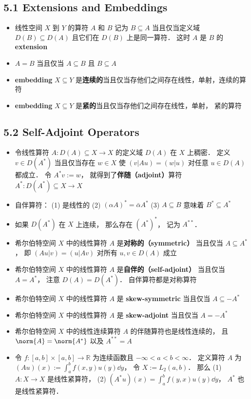 \subsection{5.1 Extensions and Embeddings}
\begin{itemize}
\item 线性空间 $X$ 到 $Y$ 的算符 $A$ 和 $B$ 记为 $B \subseteq A$ 当且仅当定义域 $D(B) \subseteq D(A)$ 且它们在 $D(B)$ 上是同一算符． 这时 $A$ 是 $B$ 的 \textbf{extension}

\item $A = B$ 当且仅当 $A\subseteq B$ 且 $B\subseteq A$

\item \textbf{embedding} $X \subseteq Y$ 是\textbf{连续的}当且仅当存他们之间存在线性，单射，连续的算符

\item \textbf{embedding} $X \subseteq Y$ 是\textbf{紧的}当且仅当存他们之间存在线性，单射， 紧的算符
\end{itemize}


\subsection{5.2 Self-Adjoint Operators}
\begin{itemize}
\item 令线性算符 $A: D(A) \subseteq X \to X$ 的定义域 $D(A)$ 在 $X$ 上稠密． 定义 $v \in D(A^*)$ 当且仅当存在 $w\in X$ 使 $(v|Au) = (w|u)$ 对任意 $u\in D(A)$ 都成立． 令 $A^*v := w$， 就得到了\textbf{伴随（adjoint）}算符 $A^*: D(A^*) \subseteq X \to X$

\item 自伴算符： (1) 是线性的 (2) $(\alpha A)^* = \bar \alpha A^*$ (3) $A \subseteq B$ 意味着 $B^* \subseteq A^*$

\item 如果 $D(A^*)$ 在 $X$ 上连续， 那么存在 $(A^*)^*$， 记为 $A^{**}$．

\item 希尔伯特空间 $X$ 中的线性算符 $A$ 是\textbf{对称的（symmetric）} 当且仅当 $A \subseteq A^*$， 即 $(Au|v)=(u|Av)$ 对所有 $u, v\in D(A)$ 成立

\item 希尔伯特空间 $X$ 中的线性算符 $A$ 是\textbf{自伴的（self-adjoint）} 当且仅当 $A = A^*$， 注意 $D(A) = D(A^*)$． 自伴算符都是对称算符

\item 希尔伯特空间 $X$ 中的线性算符 $A$ 是 \textbf{skew-symmetric} 当且仅当 $A \subseteq -A^*$

\item 希尔伯特空间 $X$ 中的线性算符 $A$ 是 \textbf{skew-adjoint} 当且仅当 $A = -A^*$

\item 希尔伯特空间 $X$ 中的线性连续算符 $A$ 的伴随算符也是线性连续的， 且 $\norm{A} = \norm{A^*}$ 以及 $A^{**} = A$

\item 令 $f:[a, b]\times[a,b]\to\mathbb R$ 为连续函数且 $-\infty< a < b < \infty$． 定义算符 $A$ 为 $(Au)(x) := \int_a^b f(x, y)u(y)\dd{y}$， 令 $X := L_2(a, b)$． 那么 (1) $A: X\to X$ 是线性紧算符， (2) $(A^*u)(x) = \int_a^b f(y, x) u(y)\dd{y}$， $A^*$ 也是线性紧算符．
\end{itemize}
